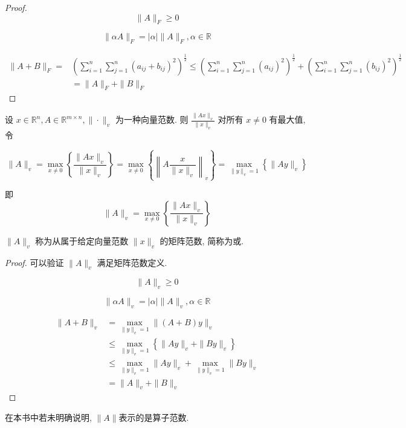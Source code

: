 \begin{proof}
    $$ \|A\|_{F} \geq 0 $$

    $$ \|\alpha A\|_{F}=|\alpha|\|A\|_{F}, \alpha \in \mathbb{R} $$

    $$ \begin{aligned}\|A+B\|_{F}=&\left(\sum_{i=1}^{n} \sum_{j=1}^{n}\left(a_{i j}+b_{i j}\right)^{2}\right)^{\frac{1}{2}} \leq\left(\sum_{i=1}^{n} \sum_{j=1}^{n}\left(a_{i j}\right)^{2}\right)^{\frac{1}{2}}+\left(\sum_{i=1}^{n} \sum_{j=1}^{n}\left(b_{i j}\right)^{2}\right)^{\frac{1}{2}} \\ &=\|A\|_{F}+\|B\|_{F} \end{aligned} $$
\end{proof}

\begin{definition}
    设 $ x \in \mathbb{R}^{n}, A \in \mathbb{R}^{m \times n},\|\cdot\|_{v} $ 为一种向量范数. 则 $ \frac{\|A x\|_{v}}{\|x\|_{v}} $ 对所有 $ x \neq 0 $ 有最大值, 令

    $$ \|A\|_{v}=\max _{x \neq 0}\left\{\frac{\|A x\|_{v}}{\|x\|_{v}}\right\}=\max _{x \neq 0}\left\{\left\|A \frac{x}{\|x\|_{v}}\right\|_{v}\right\}=\max _{\|y\|_{v}=1}\left\{\|A y\|_{v}\right\} $$

    即$$ \|A\|_{v}=\max _{x \neq 0}\left\{\frac{\|A x\|_{v}}{\|x\|_{v}}\right\} $$

    $ \|A\|_{v} $ 称为从属于给定向量范数 $ \|x\|_{v} $ 的矩阵范数, 简称为或.
\end{definition}

\begin{proof}
    可以验证 $ \|A\|_{v} $ 满足矩阵范数定义. 

    $$ \|A\|_{v} \geq 0 $$

    $$ \|\alpha A\|_{v}=|\alpha|\|A\|_{v}, \alpha \in \mathbb{R} $$

    $$\begin{aligned}
        \|A+B\|_{v} &=\max _{\|y\|_{v}=1}\|(A+B) y\|_{v} \\
        &\leq \max _{\|y\|_{v}=1}\left\{\|A y\|_{v}+\|B y\|_{v}\right\} \\
        & \leq \max _{\|y\|_{v}=1}\|A y\|_{v}+\max _{\|y\|_{v}=1}\|B y\|_{v} \\
        & =\|A\|_{v}+\|B\|_{v}
    \end{aligned}$$

\end{proof}

\begin{remark}
    在本书中若未明确说明, $\|A \|$表示的是算子范数.
\end{remark}

